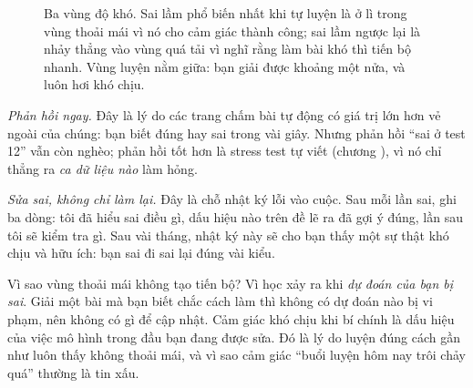 \documentclass[../../algorithm.tex]{subfiles}
\begin{document}
\begin{figure}[H]\centering
{}
\caption{Ba vùng độ khó. Sai lầm phổ biến nhất khi tự luyện là ở lì trong vùng thoải mái vì nó cho cảm giác thành công; sai lầm ngược lại là nhảy thẳng vào vùng quá tải vì nghĩ rằng làm bài khó thì tiến bộ nhanh. Vùng luyện nằm giữa: bạn giải được khoảng một nửa, và luôn hơi khó chịu.}
\label{fig:vung-luyen}
\end{figure}

\emph{Phản hồi ngay.} Đây là lý do các trang chấm bài tự động có giá trị lớn hơn vẻ ngoài của chúng: bạn biết đúng hay sai trong vài giây. Nhưng phản hồi ``sai ở test 12'' vẫn còn nghèo; phản hồi tốt hơn là stress test tự viết (chương ), vì nó chỉ thẳng ra \emph{ca dữ liệu nào} làm hỏng.

\emph{Sửa sai, không chỉ làm lại.} Đây là chỗ nhật ký lỗi vào cuộc. Sau mỗi lần sai, ghi ba dòng: tôi đã hiểu sai điều gì, dấu hiệu nào trên đề lẽ ra đã gợi ý đúng, lần sau tôi sẽ kiểm tra gì. Sau vài tháng, nhật ký này sẽ cho bạn thấy một sự thật khó chịu và hữu ích: bạn sai đi sai lại đúng vài kiểu.

\begin{trucgiac}
Vì sao vùng thoải mái không tạo tiến bộ? Vì học xảy ra khi \emph{dự đoán của bạn bị sai}. Giải một bài mà bạn biết chắc cách làm thì không có dự đoán nào bị vi phạm, nên không có gì để cập nhật. Cảm giác khó chịu khi bí chính là dấu hiệu của việc mô hình trong đầu bạn đang được sửa. Đó là lý do luyện đúng cách gần như luôn thấy không thoải mái, và vì sao cảm giác ``buổi luyện hôm nay trôi chảy quá'' thường là tin xấu.
\end{trucgiac}
\end{document}
